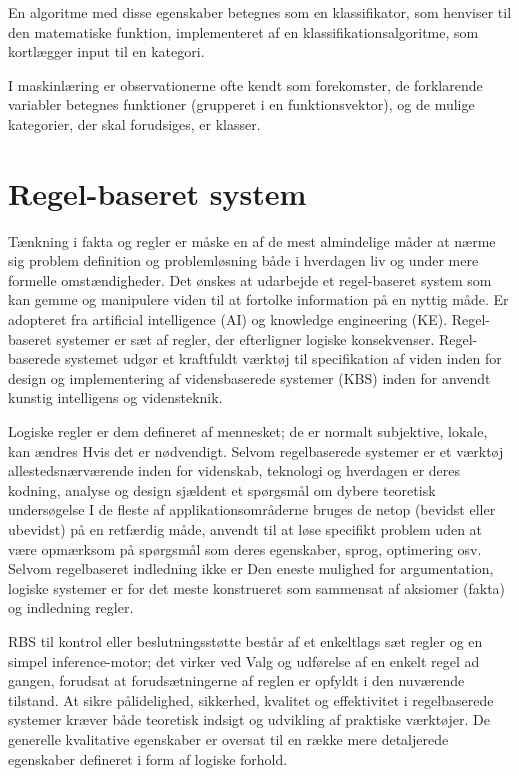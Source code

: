 En algoritme med disse egenskaber betegnes som en klassifikator, som henviser til den matematiske funktion, implementeret af en klassifikationsalgoritme, som kortlægger input til en kategori.

I maskinlæring er observationerne ofte kendt som forekomster, de forklarende variabler betegnes funktioner (grupperet i en funktionsvektor), og de mulige kategorier, der skal forudsiges, er klasser. 

\section{Regel-baseret system}
Tænkning i fakta og regler er måske en af ​​de mest almindelige måder at nærme sig problem definition og problemløsning både i hverdagen
liv og under mere formelle omstændigheder.
Det ønskes at udarbejde et regel-baseret system som kan gemme og manipulere viden til at fortolke information på en nyttig måde. Er adopteret fra artificial intelligence (AI) og knowledge engineering (KE). Regel-baseret systemer er sæt af regler, der efterligner logiske konsekvenser. Regel-baserede systemet udgør et kraftfuldt værktøj til specifikation af viden inden for design og implementering af vidensbaserede systemer (KBS) inden for anvendt kunstig intelligens og vidensteknik. 

Logiske regler
er dem defineret af mennesket; de er normalt subjektive, lokale, kan ændres
Hvis det er nødvendigt. Selvom regelbaserede systemer er et værktøj allestedsnærværende inden for videnskab, teknologi
og hverdagen er deres kodning, analyse og design sjældent et spørgsmål om
dybere teoretisk undersøgelse I de fleste af applikationsområderne bruges de netop (bevidst eller ubevidst) på en retfærdig måde, anvendt til at løse specifikt problem uden at være opmærksom på spørgsmål som deres egenskaber,
sprog, optimering osv. Selvom regelbaseret indledning ikke er
Den eneste mulighed for argumentation, logiske systemer er for det meste konstrueret som
sammensat af aksiomer (fakta) og indledning regler.

RBS til kontrol eller beslutningsstøtte
består af et enkeltlags sæt regler og en simpel inference-motor; det virker ved
Valg og udførelse af en enkelt regel ad gangen, forudsat at forudsætningerne
af reglen er opfyldt i den nuværende tilstand. 
At sikre pålidelighed, sikkerhed, kvalitet og effektivitet i regelbaserede systemer kræver både teoretisk indsigt
og udvikling af praktiske værktøjer. De generelle kvalitative egenskaber er
oversat til en række mere detaljerede egenskaber defineret i form af
logiske forhold.


